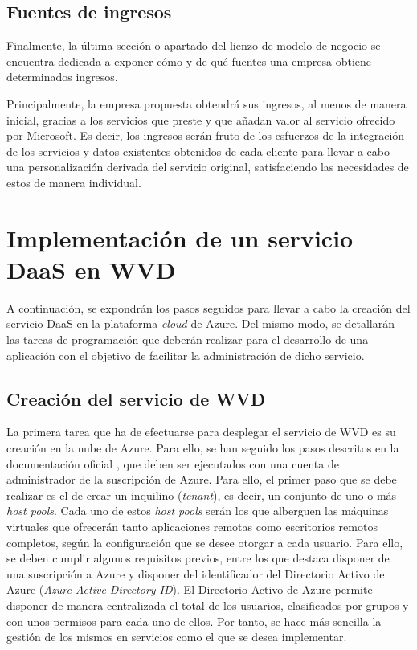 \subsection{Fuentes de ingresos}
Finalmente, la última sección o apartado del lienzo de modelo de negocio se encuentra dedicada a exponer cómo y de qué fuentes una empresa obtiene determinados ingresos.

Principalmente, la empresa propuesta obtendrá sus ingresos, al menos de manera inicial, gracias a los servicios que preste y que añadan valor al servicio ofrecido por Microsoft. Es decir, los ingresos serán fruto de los esfuerzos de la integración de los servicios y datos existentes obtenidos de cada cliente para llevar a cabo una personalización derivada del servicio original, satisfaciendo las necesidades de estos de manera individual.





\clearpage

\section{Implementación de un servicio \acs{DaaS} en \acs{WVD}}
A continuación, se expondrán los pasos seguidos para llevar a cabo la creación del servicio \acs{DaaS} en la plataforma \textit{cloud} de Azure. Del mismo modo, se detallarán las tareas de programación que deberán realizar para el desarrollo de una aplicación con el objetivo de facilitar la administración de dicho servicio.

\subsection{Creación del servicio de \acs{WVD}}
La primera tarea que ha de efectuarse para desplegar el servicio de \acs{WVD} es su creación en la nube de Azure. Para ello, se han seguido los pasos descritos en la documentación oficial \cite{microsofttutowvd}, que deben ser ejecutados con una cuenta de administrador de la suscripción de Azure. Para ello, el primer paso que se debe realizar es el de crear un inquilino (\textit{tenant}), es decir, un conjunto de uno o más \textit{host pools}. Cada uno de estos \textit{host pools} serán los que alberguen las máquinas virtuales que ofrecerán tanto aplicaciones remotas como escritorios remotos completos, según la configuración que se desee otorgar a cada usuario. Para ello, se deben cumplir algunos requisitos previos, entre los que destaca disponer de una suscripción a Azure y disponer del identificador del Directorio Activo de Azure (\textit{Azure Active Directory ID}). El Directorio Activo de Azure permite disponer de manera centralizada el total de los usuarios, clasificados por grupos y con unos permisos para cada uno de ellos. Por tanto, se hace más sencilla la gestión de los mismos en servicios como el que se desea implementar.

